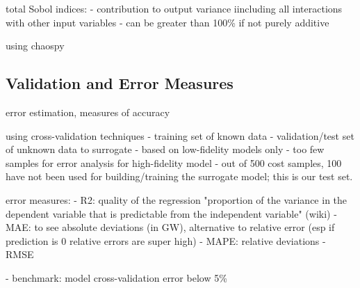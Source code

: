 total Sobol indices:
- contribution to output variance iincluding all interactions with other input variables
- can be greater than 100\% if not purely additive

using chaospy \cite{feinberg_chaospy_2015}

\subsection{Validation and Error Measures}
\label{sec:validation}

error estimation, measures of accuracy

using cross-validation techniques 
- training set of known data
- validation/test set of unknown data to surrogate \cite{gratiet_metamodel-based_2015}
- based on low-fidelity models only
- too few samples for error analysis for high-fidelity model
- out of 500 cost samples, 100 have not been used for building/training the surrogate model; this is our test set.

error measures:
- R2: quality of the regression "proportion of the variance in the dependent variable that is predictable from the independent variable" (wiki)
- MAE: to see absolute deviations (in GW), alternative to relative error (esp if prediction is 0 relative errors are super high)
- MAPE: relative deviations
- RMSE

- benchmark: model cross-validation error below 5\% \cite{trondle_trade-offs_2020}
